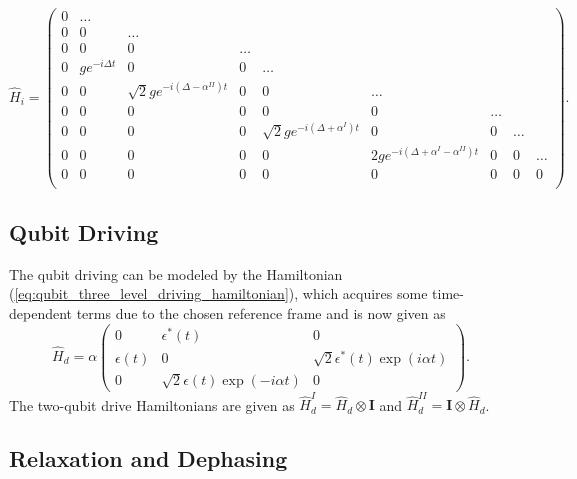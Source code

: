 \begin{equation}
\hat{H}_i = \left(
			\begin{array}{lllllllll}
				0 & \hdots \\
				0 & 0 & \hdots \\
				0 & 0 & 0 & \hdots \\
				0 & ge^{-i\Delta t} & 0 & 0 & \hdots  \\
				0 & 0 & \sqrt{2}ge^{-i(\Delta-\alpha^{II}) t} & 0 & 0 & \hdots  \\
				0 & 0 & 0 & 0 & 0 & 0 & \hdots \\
				0 & 0 & 0 & 0 & \sqrt{2}ge^{-i(\Delta+\alpha^I) t} & 0 & 0 & \hdots \\
				0 & 0 & 0 & 0 & 0 & 2ge^{-i(\Delta+\alpha^{I}-\alpha^{II}) t} & 0 & 0 & \hdots \\
				0 & 0 & 0 & 0 & 0 & 0 & 0 & 0 & 0 \\
			\end{array}
		\right).
\end{equation}
%
\subsection{Qubit Driving}

The qubit driving can be modeled by the Hamiltonian (\ref{eq:qubit_three_level_driving_hamiltonian}), which acquires some time-dependent terms due to the chosen reference frame and is now given as
%
\begin{equation}
\hat{H}_d = \alpha\left(
						 \begin{array}{ccc}
						0 & \epsilon^*(t) & 0 \\
						\epsilon(t) & 0 & \sqrt{2}\epsilon^*(t)\exp{\left(i\alpha t\right)} \\
						0 & \sqrt{2}\epsilon(t)\exp{\left(-i\alpha t\right)} & 0
						\end{array}
					\right). \label{eq:qubit_three_level_driving_hamiltonian_modified}
\end{equation}
%
The two-qubit drive Hamiltonians are given as $\hat{H}_d^I= \hat{H}_d\otimes \mathbf{I}$ and $\hat{H}_d^{II}=\mathbf{I}\otimes\hat{H}_d$.
\subsection{Relaxation and Dephasing}

